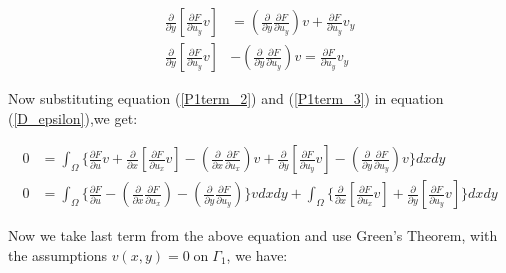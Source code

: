 \begin{align}\label{P1term_3}
     \frac{\partial }{\partial y} \left [ \frac{\partial F}{\partial u_y}v \right]  & = \left(\frac{\partial }{\partial y} \frac{\partial F}{\partial u_y} \right) v + \frac{\partial F}{\partial u_y}v_y\nonumber\\
     \frac{\partial }{\partial y} \left [ \frac{\partial F}{\partial u_y}v \right]  & - \left(\frac{\partial }{\partial y} \frac{\partial F}{\partial u_y} \right) v = \frac{\partial F}{\partial u_y}v_y
\end{align}

\noindent
Now substituting equation (\ref{P1term_2}) and (\ref{P1term_3}) in equation (\ref{D_epsilon}),we get:

\begin{align}\label{D_epsilon_zero}
    0 &= \int_{\Omega} \Bigg\{  \frac{\partial F}{\partial u}v + \frac{\partial }{\partial x} \left [ \frac{\partial F}{\partial u_x}v \right]   - \left(\frac{\partial }{\partial x} \frac{\partial F}{\partial u_x} \right) v + \frac{\partial }{\partial y} \left [ \frac{\partial F}{\partial u_y}v \right]   - \left(\frac{\partial }{\partial y} \frac{\partial F}{\partial u_y} \right) v   \Bigg\} dxdy\nonumber\\
    0 &= \int_{\Omega} \Bigg\{  \frac{\partial F}{\partial u}    - \left(\frac{\partial }{\partial x} \frac{\partial F}{\partial u_x} \right)   - \left(\frac{\partial }{\partial y} \frac{\partial F}{\partial u_y} \right)    \Bigg\}v dxdy + \int_{\Omega} \Bigg\{ \frac{\partial }{\partial x} \left [ \frac{\partial F}{\partial u_x}v \right] + \frac{\partial }{\partial y} \left [ \frac{\partial F}{\partial u_y}v \right] \Bigg\}dxdy 
\end{align}

\noindent Now we take last term from the above equation and use Green's Theorem, with the assumptions $v(x,y)=0\mathrm{\;on\;}\Gamma_1$, we have:

